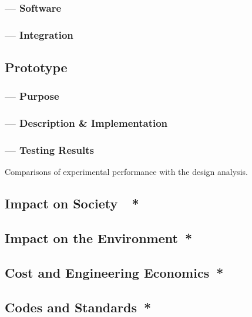 \documentclass[twocolumn]{article}
\begin{document}
\subsubsection*{ --- Software}
\subsubsection*{ --- Integration}   

\subsection*{Prototype}
\subsubsection*{ --- Purpose}
\subsubsection*{ --- Description \& Implementation}
\subsubsection*{ --- Testing Results}Comparisons of experimental performance with the design analysis.




\subsection*{Impact on Society\color{red}\ {{\color{red}\ *}}}

\subsection*{Impact on the Environment{{\color{red}\ *}}}

\subsection*{Cost and Engineering Economics{{\color{red}\ *}}}

\subsection*{Codes and Standards{{\color{red}\ *}}}

\end{document}
